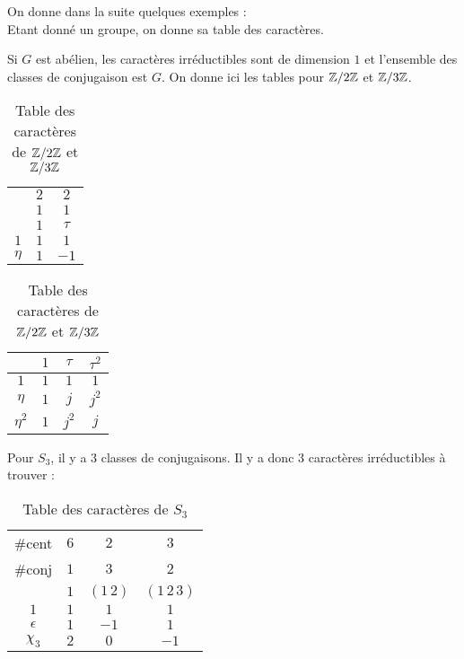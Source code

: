 \documentclass{cours}
\begin{document}
On donne dans la suite quelques exemples :\\
Etant donné un groupe, on donne sa table des caractères.
\begin{proposition}
    Si $G$ est abélien, les caractères irréductibles sont de dimension $1$ et l'ensemble des classes de conjugaison est $G$. On donne ici les tables pour $\mathbb{Z}/2\mathbb{Z}$ et $\mathbb{Z}/3\mathbb{Z}$.
    \begin{table}[ht]
        \centering
        \begin{tabular}{c|cc}
                   & $2$ & $2$    \\
                   & $1$ & $1$    \\
                   & $1$ & $\tau$ \\
            \midrule
            $1$    & $1$ & $1$    \\
            $\eta$ & $1$ & $-1$
        \end{tabular}
        \hspace{.2\linewidth}
        \begin{tabular}{c|ccc}
                       & $1$ & $\tau$  & $\tau^{2}$ \\
            \midrule
            $1$        & $1$ & $1$     & $1$        \\
            $\eta$     & $1$ & $j$     & $j^{2}$    \\
            $\eta^{2}$ & $1$ & $j^{2}$ & $j$
        \end{tabular}
        \caption{Table des caractères de $\mathbb{Z}/2\mathbb{Z}$ et $\mathbb{Z}/3\mathbb{Z}$}
    \end{table}
\end{proposition}

\begin{proposition}
    Pour $S_{3}$, il y a $3$ classes de conjugaisons. Il y a donc $3$ caractères irréductibles à trouver :
    \begin{table}[ht]
        \centering
        \begin{tabular}{c|ccc}
            \#cent     & $6$ & $2$       & $3$            \\
            \#conj     & $1$ & $3$       & $2$            \\
                       & $1$ & $(1\, 2)$ & $(1\, 2 \, 3)$ \\
            \midrule
            $1$        & $1$ & $1$       & $1$            \\
            $\epsilon$ & $1$ & $-1$      & $1$            \\
            $\chi_{3}$ & $2$ & $0$       & $-1$
        \end{tabular}
        \caption{Table des caractères de $S_{3}$}
    \end{table}
\end{proposition}
\end{document}
